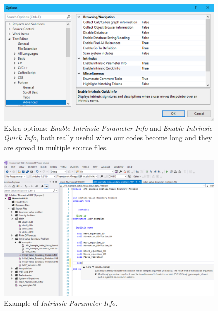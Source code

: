 \begin{itemize}
    \begin{figure}
        \centering
        \includegraphics[width=  \textwidth]{Figures/Commands4}
        \caption{Extra options: \textit{Enable Intrinsic Parameter Info} and \textit{Enable Intrinsic Quick Info}, both really useful when our codes become long and they are spread in multiple source files.}
        \label{fig:Commands4}
    \end{figure}

    \begin{figure}
        \centering
        \includegraphics[width= \textwidth]{Figures/Commands5}
        \caption{Example of \textit{Intrinsic Parameter Info}.}
        \label{fig:Commands5}
    \end{figure}


\end{itemize}
